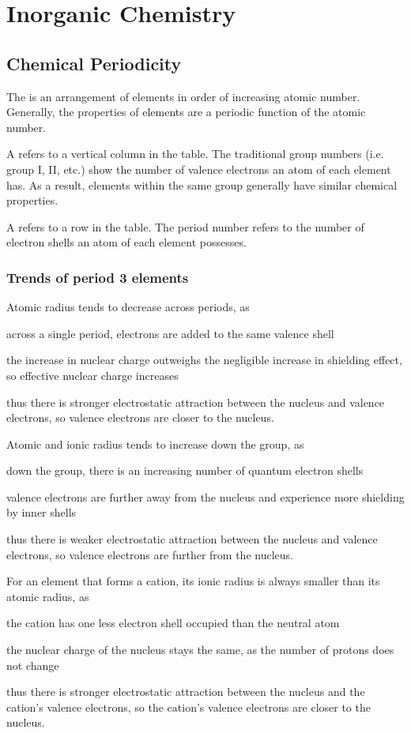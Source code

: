 \documentclass[Chemistry.tex]{subfiles}
\begin{document}
\chapter{Inorganic Chemistry}
\section{Chemical Periodicity}
The  is an arrangement of elements in order of increasing atomic number. Generally, the properties of elements are a periodic function of the atomic number.

A  refers to a vertical column in the table. The traditional group numbers (i.e. group I, II, etc.) show the number of valence electrons an atom of each element has. As a result, elements within the same group generally have similar chemical properties.

A  refers to a row in the table. The period number refers to the number of electron shells an atom of each element possesses.
\subsection{Trends of period 3 elements}
Atomic radius tends to decrease across periods, as \begin{slinenum}
\item across a single period, electrons are added to the same valence shell
\item the increase in nuclear charge outweighs the negligible increase in shielding effect, so effective nuclear charge increases
\item thus there is stronger electrostatic attraction between the nucleus and valence electrons, so valence electrons are closer to the nucleus.
\end{slinenum}

Atomic and ionic radius tends to increase down the group, as \begin{slinenum}
\item down the group, there is an increasing number of quantum electron shells
\item valence electrons are further away from the nucleus and experience more shielding by inner shells
\item thus there is weaker electrostatic attraction between the nucleus and valence electrons, so valence electrons are further from the nucleus.
\end{slinenum}

For an element that forms a cation, its ionic radius is always smaller than its atomic radius, as \begin{slinenum}
\item the cation has one less electron shell occupied than the neutral atom
\item the nuclear charge of the nucleus stays the same, as the number of protons does not change
\item thus there is stronger electrostatic attraction between the nucleus and the cation's valence electrons, so the cation's valence electrons are closer to the nucleus.
\end{slinenum}
\end{document}
